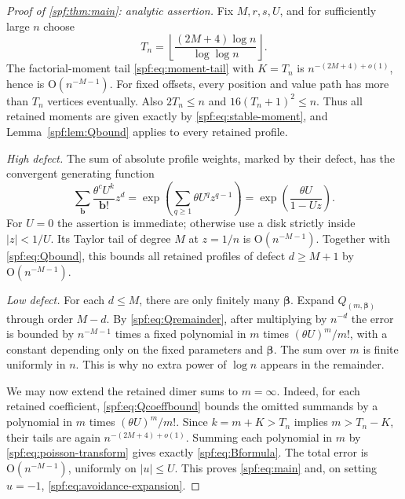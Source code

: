 \documentclass[11pt]{article}
\numberwithin{equation}{section}
\theoremstyle{definition}
\theoremstyle{remark}
\theoremstyle{definition}
\newcommand{\bfac}{\mathbf b!}
\newcommand{\bigO}{\mathrm O}
\begin{document}
\begin{proof}[Proof of \cref{spf:thm:main}: analytic assertion]
Fix $M,r,s,U$, and for sufficiently large $n$ choose
\begin{equation}
 T_n=\left\lfloor\frac{(2M+4)\log n}{\log\log n}\right\rfloor.
\end{equation}
The factorial-moment tail \eqref{spf:eq:moment-tail} with $K=T_n$ is
$n^{-(2M+4)+o(1)}$, hence is $\bigO(n^{-M-1})$. For fixed offsets, every
position and value path has more than $T_n$ vertices eventually. Also
$2T_n\le n$ and $16(T_n+1)^2\le n$. Thus all retained moments are given
exactly by \eqref{spf:eq:stable-moment}, and Lemma~\ref{spf:lem:Qbound} applies to every
retained profile.

\emph{High defect.} The sum of absolute profile weights, marked by their defect,
has the convergent generating function
\begin{equation}
 \sum_{\mathbf b}\frac{\theta^c U^k}{\bfac}z^d
 =\exp\left(\sum_{q\ge1}\theta U^q z^{q-1}\right)
 =\exp\left(\frac{\theta U}{1-Uz}\right).
 \label{spf:eq:defect-majorant}
\end{equation}
For $U=0$ the assertion is immediate; otherwise use a disk strictly inside
$|z|<1/U$. Its Taylor tail of degree $M$ at $z=1/n$ is
$\bigO(n^{-M-1})$. Together with \eqref{spf:eq:Qbound}, this bounds all retained
profiles of defect $d\ge M+1$ by $\bigO(n^{-M-1})$.

\emph{Low defect.} For each $d\le M$, there are only finitely many
$\boldsymbol\beta$. Expand $Q_{(m,\boldsymbol\beta)}$ through order $M-d$.
By \eqref{spf:eq:Qremainder}, after multiplying by $n^{-d}$ the error is bounded
by $n^{-M-1}$ times a fixed polynomial in $m$ times
$(\theta U)^m/m!$, with a constant depending only on the fixed parameters
and $\boldsymbol\beta$. The sum over $m$ is finite uniformly in $n$. This is
why no extra power of $\log n$ appears in the remainder.

We may now extend the retained dimer sums to $m=\infty$. Indeed, for each
retained coefficient, \eqref{spf:eq:Qcoeffbound} bounds the omitted summands by a
polynomial in $m$ times $(\theta U)^m/m!$. Since $k=m+K>T_n$ implies
$m>T_n-K$, their tails are again
$n^{-(2M+4)+o(1)}$. Summing each polynomial in $m$ by
\eqref{spf:eq:poisson-transform} gives exactly \eqref{spf:eq:Bformula}. The total error
is $\bigO(n^{-M-1})$, uniformly on $|u|\le U$. This proves
\eqref{spf:eq:main} and, on setting $u=-1$, \eqref{spf:eq:avoidance-expansion}.
\end{proof}
\end{document}
